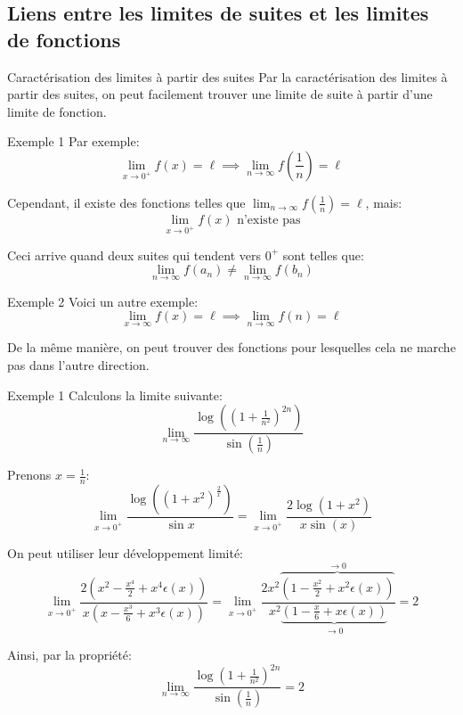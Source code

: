 \documentclass[a4paper]{article}
\begin{document}
\subsection[Limites de suites et limites de fonctions]{Liens entre les limites de suites et les limites de fonctions}
\begin{parag}{Caractérisation des limites à partir des suites}
    Par la caractérisation des limites à partir des suites, on peut facilement trouver une limite de suite à partir d'une limite de fonction.

    \begin{subparag}{Exemple 1}
        Par exemple: 
        \[\lim_{x \to 0^+} f\left(x\right) = \ell \implies \lim_{n \to \infty} f\left(\frac{1}{n}\right) = \ell\]
        
        Cependant, il existe des fonctions telles que $\lim_{n \to \infty} f\left(\frac{1}{n}\right) = \ell$, mais: 
        \[\lim_{x \to 0^+} f\left(x\right) \text{ n'existe pas}\]

        Ceci arrive quand deux suites qui tendent vers $0^+$ sont telles que: 
        \[\lim_{n \to \infty} f\left(a_n\right) \neq \lim_{n \to \infty} f\left(b_n\right)\]
        
    \end{subparag}
    
    \begin{subparag}{Exemple 2}
        Voici un autre exemple: 
        \[\lim_{x \to \infty} f\left(x\right) = \ell \implies \lim_{n \to \infty} f\left(n\right) = \ell\]
        
        De la même manière, on peut trouver des fonctions pour lesquelles cela ne marche pas dans l'autre direction.
    \end{subparag}

\end{parag}

\begin{parag}{Exemple 1}
    Calculons la limite suivante: 
    \[\lim_{n \to \infty} \frac{\log\left(\left(1 + \frac{1}{n^2}\right)^{2n}\right)}{\sin\left(\frac{1}{n}\right)}\]
    
    Prenons $x = \frac{1}{n}$: 
    \[\lim_{x \to 0^+} \frac{\log\left(\left(1 + x^2\right)^{\frac{2}{x}}\right)}{\sin x} = \lim_{x \to 0^+} \frac{2 \log\left(1 + x^2\right)}{x \sin\left(x\right)}\]
    
    On peut utiliser leur développement limité: 
    \[\lim_{x \to 0^+} \frac{2\left(x^2 - \frac{x^4}{2} + x^4 \epsilon\left(x\right)\right)}{x\left(x - \frac{x^3}{6} + x^3 \epsilon\left(x\right)\right)} = \lim_{x \to 0^+} \frac{2x^2 \overbrace{\left(1 - \frac{x^2}{2} + x^2 \epsilon\left(x\right)\right)}^{\to 0}}{x^2 \underbrace{\left(1 - \frac{x}{6} + x\epsilon\left(x\right)\right)}_{\to 0}} = 2\]
    
    Ainsi, par la propriété: 
    \[\lim_{n \to \infty} \frac{\log\left(1 + \frac{1}{n^2}\right)^{2n}}{\sin\left(\frac{1}{n}\right)} = 2\]
\end{parag}
\end{document}
